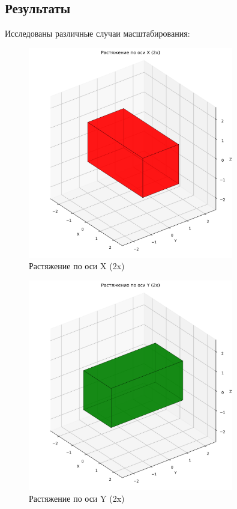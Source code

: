 \subsection*{Результаты}
Исследованы различные случаи масштабирования:

\begin{figure}[H]
\centering
\includegraphics[width=0.8\textwidth]{images/task2/scale_x.png}
\caption{Растяжение по оси X (2x)}
\end{figure}

\begin{figure}[H]
\centering
\includegraphics[width=0.8\textwidth]{images/task2/scale_y.png}
\caption{Растяжение по оси Y (2x)}
\end{figure}


